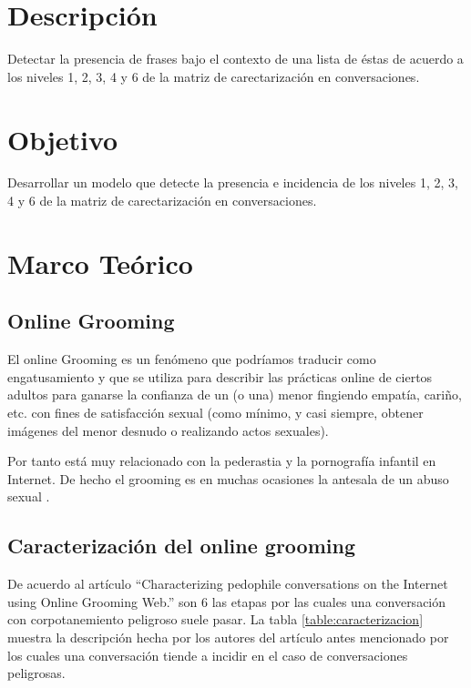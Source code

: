 \section{Descripci\'on}
Detectar la presencia de frases bajo el contexto de una lista de éstas de acuerdo a los niveles 1, 2, 3, 4 y 6 de la matriz de carectarizaci\'on en conversaciones.

\section{Objetivo}
Desarrollar un modelo que detecte la presencia e incidencia de los niveles 1, 2, 3, 4 y 6 de la matriz de carectarizaci\'on en conversaciones.

\section{Marco Te\'orico}
\subsection{Online Grooming}
El online Grooming es un fenómeno que podr\'iamos traducir como engatusamiento y que se utiliza para describir las pr\'acticas online de ciertos adultos para ganarse la confianza de un (o una) menor fingiendo empat\'ia, cariño, etc. con fines de satisfacción sexual (como m\'inimo, y casi siempre, obtener im\'agenes del menor desnudo o realizando actos sexuales).

Por tanto est\'a muy relacionado con la pederastia y la pornograf\'ia infantil en Internet. De hecho el grooming es en muchas ocasiones la antesala de un abuso sexual \cite{grooming}.

\subsection{Caracterización del online grooming}
De acuerdo al art\'iculo ``Characterizing pedophile conversations on the Internet using Online Grooming Web.'' \cite{articulo} son 6 las etapas por las cuales una conversaci\'on con corpotanemiento peligroso suele pasar. 
La tabla \ref{table:caracterizacion} muestra la descripci\'on hecha por los autores del art\'iculo antes mencionado por los cuales una conversaci\'on tiende a incidir en el caso de conversaciones peligrosas.

